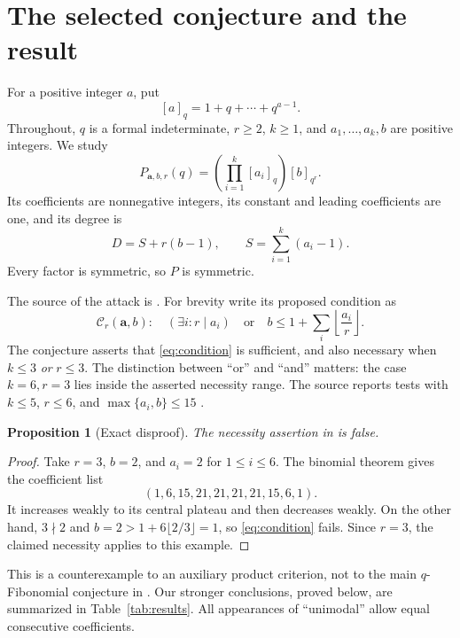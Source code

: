 \documentclass[11pt]{article}
\theoremstyle{research}
\newtheorem{proposition}[theorem]{Proposition}
\theoremstyle{definition}
\newcommand{\qi}[1]{[#1]_q}
\newcommand{\qir}[2]{[#1]_{q^{#2}}}
\numberwithin{equation}{section}
\begin{document}
\section{The selected conjecture and the result}
\label{sec:target}
For a positive integer $a$, put
\[
 \qi{a}=1+q+\cdots+q^{a-1}.
\]
Throughout, $q$ is a formal indeterminate, $r\ge2$, $k\ge1$, and
$a_1,\ldots,a_k,b$ are positive integers. We study
\begin{equation}\label{eq:product}
 P_{\boldsymbol a,b,r}(q)
   =\left(\prod_{i=1}^{k}\qi{a_i}\right)\qir{b}{r}.
\end{equation}
Its coefficients are nonnegative integers, its constant and leading
coefficients are one, and its degree is
\begin{equation}\label{eq:degree}
 D=S+r(b-1),\qquad S=\sum_{i=1}^k(a_i-1).
\end{equation}
Every factor is symmetric, so $P$ is symmetric.

The source of the attack is \cite[Conjecture 5.4, p.~14]{CIMSY}.
For brevity write its proposed condition as
\begin{equation}\label{eq:condition}
 \mathcal C_r(\boldsymbol a,b):\quad
 (\exists i\colon r\mid a_i)
 \quad\text{or}\quad
 b\le 1+\sum_i\left\lfloor\frac{a_i}{r}\right\rfloor.
\end{equation}
The conjecture asserts that \eqref{eq:condition} is sufficient, and also
necessary when $k\le3$ \emph{or} $r\le3$.
The distinction between ``or'' and ``and'' matters: the case
$k=6,r=3$ lies inside the asserted necessity range.
The source reports tests with $k\le5$, $r\le6$, and
$\max\{a_i,b\}\le15$ \cite[p.~14]{CIMSY}.

\begin{proposition}[Exact disproof]\label{prop:counterexample}
The necessity assertion in \cite[Conjecture 5.4]{CIMSY} is false.
\end{proposition}
\begin{proof}
Take $r=3$, $b=2$, and $a_i=2$ for $1\le i\le6$.
The binomial theorem gives the coefficient list
\[
 (1,6,15,21,21,21,21,15,6,1).
\]
It increases weakly to its central plateau and then decreases weakly.
On the other hand, $3\nmid2$ and
$b=2>1+6\lfloor2/3\rfloor=1$, so \eqref{eq:condition} fails.
Since $r=3$, the claimed necessity applies to this example.
\end{proof}

This is a counterexample to an auxiliary product criterion, not to the
main $q$-Fibonomial conjecture in \cite{CIMSY}.
Our stronger conclusions, proved below, are summarized in
Table~\ref{tab:results}. All appearances of ``unimodal'' allow equal
consecutive coefficients.
\end{document}
